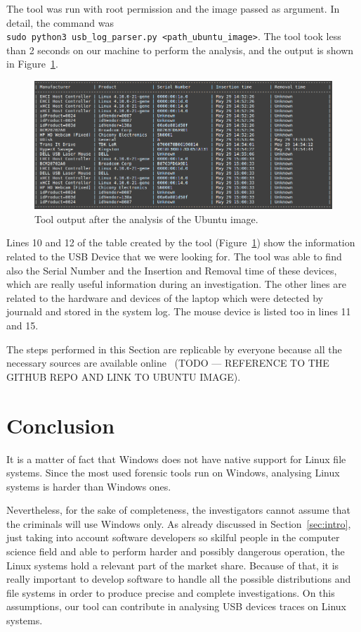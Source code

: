 \documentclass[a4paper]{article}
\begin{document}
The tool was run with root permission and the image passed as argument. In
detail, the command was \texttt{sudo~python3~usb\_log\_parser.py~<path\_ubuntu\_image>}.
The tool took less than 2 seconds on our machine to perform the analysis, and
the output is shown in Figure~\ref{restool}.

\begin{figure}[h]
\centering
\includegraphics[scale=0.8]{images/ubu_res.PNG}
\caption{Tool output after the analysis of the Ubuntu image.}
\label{restool}
\end{figure}

Lines 10 and 12 of the table created by the tool (Figure~\ref{restool}) show the
information related to the USB Device that we were looking for. The tool was
able to find also the Serial Number and the Insertion and Removal time of these
devices, which are really useful information during an investigation. The other
lines are related to the hardware and devices of the laptop which were detected
by journald and stored in the system log. The mouse device is listed too in lines
11 and 15.

The steps performed in this Section are replicable by everyone because all the
necessary sources are available online~\cite{ourtool} (TODO --- REFERENCE TO THE
GITHUB REPO AND LINK TO UBUNTU IMAGE).

\section{Conclusion}
\label{sec:concl}
It is a matter of fact that Windows does not have native support for Linux file
systems. Since the most used forensic tools run on Windows, analysing Linux
systems is harder than Windows ones.

Nevertheless, for the sake of completeness, the investigators cannot assume that
the criminals will use Windows only. As already discussed in
Section~\ref{sec:intro}, just taking into account software developers so skilful
people in the computer science field and able to perform harder and possibly
dangerous operation, the Linux systems hold a relevant part of the market
share. Because of that, it is really important to develop software to handle all
the possible distributions and file systems in order to produce precise and
complete investigations. On this assumptions, our tool can contribute in
analysing USB devices traces on Linux systems.
\end{document}
